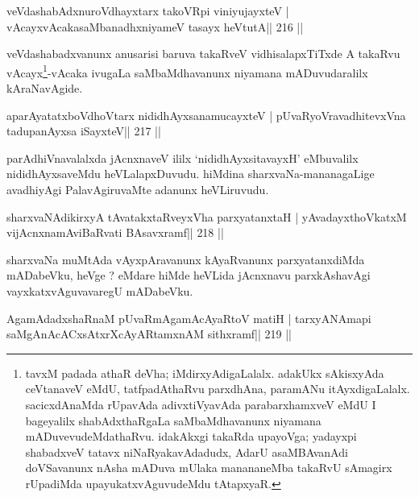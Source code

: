 \begin{shl}
veVdashabAdxnuroVdhayxtarx takoVR\s pi viniyujayxteV |
vAcayxvAcakasaMbanadhxniyameV tasayx heVtutA\hfill || 216 ||
\end{shl}

\begin{artha}
veVdashabadxvanunx anusarisi baruva takaRveV vidhisalapxTiTxde A takaRvu vAcayx\footnote[1]{tavxM padada athaR deVha; iMdirxyAdigaLalalx. adakUkx sAkisxyAda ceVtanaveV eMdU, tatf\-padAthaRvu parxdhAna, paramANu itAyxdigaLalalx. sacicxdAnaMda rUpavAda adivxtiVyavAda parabarxhamxveV eMdU I bageyalilx shabAdxthaRgaLa saMbaMdhavanunx niyamana mADuvevudeMdathaRvu. idakAkxgi takaRda upayoVga; yadayxpi shabadxveV tatavx niNaRyakavAdadudx, AdarU asaMBAvanAdi doVSa\-vanunx nAsha mADuva mUlaka manananeMba takaRvU sAmagirx rUpadiMda upayukatxvAguvudeMdu tAtapxyaR.}-vAcaka ivugaLa saMbaMdhavanunx niyamana mADuvudaralilx kAraNavAgide.
\end{artha}

\begin{shl}
aparAyatatxboVdhoV\s tarx nididhAyxsanamucayxteV |
pUvaRyoVravadhitevxVna tadupanAyxsa iSayxteV\hfill || 217 ||
\end{shl}

\begin{artha}
parAdhiVnavalalxda jAcnxnaveV ililx `nididhAyxsitavayxH' eMbuvalilx nididhAyxsaveMdu heVLalapxDuvudu. hiMdina sharxvaNa-mananagaLige avadhiyAgi PalavAgiruvaMte adanunx heVLiruvudu.
\end{artha}

\begin{shl}
sharxvaNAdikirxyA tAvatakxtaRveyxVha parxyatanxtaH |
yAvadayxthoVkatxM vijAcnxnamAviBaRvati BAsavxramf\hfill || 218 ||
\end{shl}

\begin{artha}
sharxvaNa muMtAda vAyxpAravanunx kAyaRvanunx parxyatanxdiMda mADabeVku, heVge ? eMdare hiMde heVLida jAcnxnavu parxkAshavAgi vayxkatxvAguvavaregU mADabeVku.
\end{artha}


\begin{shl}
AgamAdadxshaRnaM pUvaRmAgamAcAyaRtoV matiH |
tarxyANAmapi saMgAnAcACxsAtxrXcAyARtamxnAM sithxramf\hfill || 219 ||
\end{shl}

